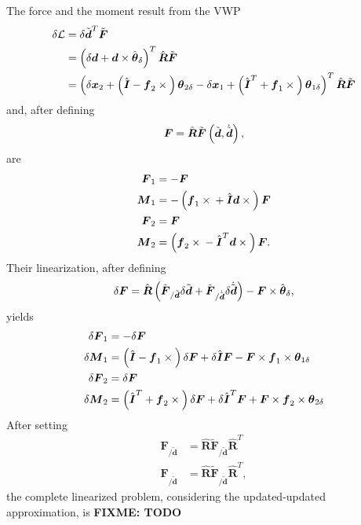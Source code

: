 \documentclass[10pt,dvips,fleqn,subeqn]{report}
\newcommand{\T}[1]{\boldsymbol{#1}}
\begin{document}
The force and the moment result from the VWP
\begin{align}
	\delta\mathcal{L} &= \delta \tilde{\T{d}}^T \tilde{\T{F}} \\
	&= \plbr{
		\delta\T{d}
		+ \T{d} \times \hat{\T{\theta}}_{\delta}
	}^T \hat{\T{R}} \tilde{\T{F}} \\
	&= \plbr{
		\delta\T{x}_2
		+ \plbr{
			\hat{\T{I}}
			- \T{f}_2\times{}
		} \T{\theta}_{2\delta}
		- \delta\T{x}_1
		+ \plbr{
			\hat{\T{I}}^T
			+ \T{f}_1\times{}
		} \T{\theta}_{1\delta}
	}^T \hat{\T{R}} \tilde{\T{F}}
\end{align}
and,
after defining
\begin{equation}
	\T{F} = \hat{\T{R}}
		\tilde{\T{F}}\plbr{\tilde{\T{d}}, \dot{\tilde{\T{d}}}} ,
\end{equation}
 are
\begin{align}
	\T{F}_1 &= - \T{F} \\
	\T{M}_1 &= - \plbr{
		\T{f}_1 \times{}
		+ \hat{\T{I}} \T{d}\times{}
	} \T{F} \\
	\T{F}_2 &= \T{F} \\
	\T{M}_2 &= \plbr{
		\T{f}_2 \times{}
		- \hat{\T{I}}^T \T{d}\times{}
	} \T{F} .
\end{align}
Their linearization, after defining
\begin{equation}
	\delta\T{F} = \hat{\T{R}} \plbr{
		\tilde{\T{F}}_{/\tilde{\T{d}}} \delta{\tilde{\T{d}}}
		+ \tilde{\T{F}}_{/\dot{\tilde{\T{d}}}} \delta\dot{\tilde{\T{d}}}
	} - \T{F} \times \hat{\T{\theta}}_{\delta} ,
\end{equation}
yields
\begin{align}
	\delta\T{F}_1 &= - \delta\T{F} \\
	\delta\T{M}_1 &= \plbr{
		\hat{\T{I}}
		- \T{f}_1 \times{}
	} \delta\T{F}
	+ \delta\hat{\T{I}} \T{F} - \T{F} \times \T{f}_1 \times \T{\theta}_{1\delta} \\
	\delta\T{F}_2 &= \delta\T{F} \\
	\delta\T{M}_2 &= \plbr{
		\hat{\T{I}}^T
		+ \T{f}_2 \times{}
	} \delta\T{F}
	+ \delta\hat{\T{I}}^T \T{F} + \T{F} \times \T{f}_2 \times \T{\theta}_{2\delta}
\end{align}
After setting
\begin{align}
	\T{F}_{/\tilde{\T{d}}} &=
		\hat{\T{R}} \tilde{\T{F}}_{/\tilde{\T{d}}} \hat{\T{R}}^T \\
	\T{F}_{/\dot{\tilde{\T{d}}}} &=
		\hat{\T{R}} \tilde{\T{F}}_{/\dot{\tilde{\T{d}}}} \hat{\T{R}}^T
	,
\end{align}
the complete linearized problem, considering the updated-updated 
approximation, is
\textbf{FIXME: TODO}
\end{document}
